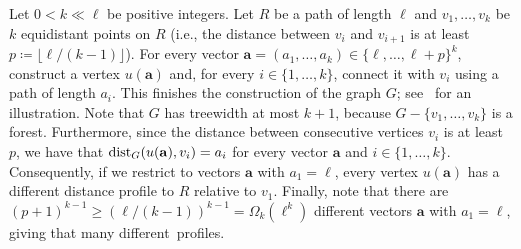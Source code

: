 Let $0 < k \ll \ell$ be positive integers.
Let $R$ be a path of length $\ell$ and $v_1,\ldots,v_k$ be $k$ equidistant
points on $R$ (i.e., the distance between $v_i$ and $v_{i+1}$ is at least $p \coloneqq \lfloor \ell/(k-1) \rfloor$).
For every vector $\mathbf{a} = (a_1,\ldots,a_k) \in \{\ell, \ldots, \ell + p \}^k$,
construct a vertex $u(\mathbf{a})$ and, for every $i\in \{1,\ldots,k\}$, connect it with
$v_i$ using a path of length $a_i$.
This finishes the construction of the graph $G$; see~ for an illustration.
Note that $G$ has treewidth at most $k+1$, because $G-\{v_1,\ldots,v_k\}$ is a forest.
Furthermore, since the distance between consecutive vertices $v_i$ is at least $p$, we have that
  $\mathrm{dist}_G(u(\mathbf{a}), v_i) = a_i$ for every vector $\mathbf{a}$ and $i\in \{1,\ldots,k\}$.
Consequently, if we restrict to vectors $\mathbf{a}$ with $a_1 = \ell$, 
every vertex $u(\mathbf{a})$ has a different distance profile to $R$ relative to $v_1$.
Finally, note that there are $(p + 1)^{k-1} \geq (\ell/(k-1))^{k-1} = \Omega_k(\ell^k)$ different
vectors $\mathbf{a}$ with $a_1=\ell$, giving that many different~profiles.
